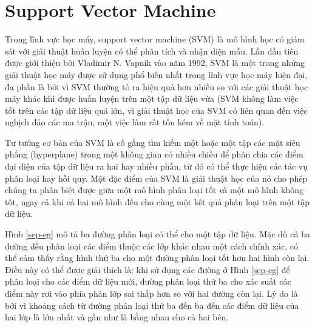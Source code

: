 \section{Support Vector Machine}
Trong lĩnh vực học máy, support vector machine (SVM) là mô hình học có giám sát với giải thuật huấn luyện có thể phân tích và nhận diện mẫu. Lần đầu tiên được giới thiệu bởi Vladimir N. Vapnik vào năm 1992, SVM là một trong những giải thuật học máy được sử dụng phổ biến nhất trong lĩnh vực học máy hiện đại, đa phần là bởi vì SVM thường tỏ ra hiệu quả hơn nhiều so với các giải thuật học máy khác khi được huấn luyện trên một tập dữ liệu vừa (SVM không làm việc tốt trên các tập dữ liệu quá lớn, vì giải thuật học của SVM có liên quan đến việc nghịch đảo các ma trận, một việc làm rất tốn kém về mặt tính toán). 

Tư tưởng cơ bản của SVM là cố gắng tìm kiếm một hoặc một tập các mặt siêu phẳng (hyperplane) trong một không gian có nhiều chiều để phân chia các điểm đại diện của tập dữ liệu ra hai hay nhiều phần, từ đó có thể thực hiện các tác vụ phân loại hay hồi quy. Một đặc điểm của SVM là giải thuật học của nó cho phép chúng ta phân biệt được giữa một mô hình phân loại tốt và một mô hình không tốt, ngay cả khi cả hai mô hình đều cho cùng một kết quả phân loại trên một tập dữ liệu.

Hình \ref{sep-eg} mô tả ba đường phân loại có thể cho một tập dữ liệu. Mặc dù cả ba đường đều phân loại các điểm thuộc các lớp khác nhau một cách chính xác, có thể cảm thấy rằng hình thứ ba cho một đường phân loại tốt hơn hai hình còn lại. Điều này có thể được giải thích là: khi sử dụng các đường ở Hình \ref{sep-eg} để phân loại cho các điểm dữ liệu mới, đường phân loại thứ ba cho xác suất các điểm này rơi vào phía phân lớp sai thấp hơn so với hai đường còn lại. Lý do là bởi vì khoảng cách từ đường phân loại thứ ba đến ba đến các điểm dữ liệu của hai lớp là lớn nhất và gần như là bằng nhau cho cả hai bên.

